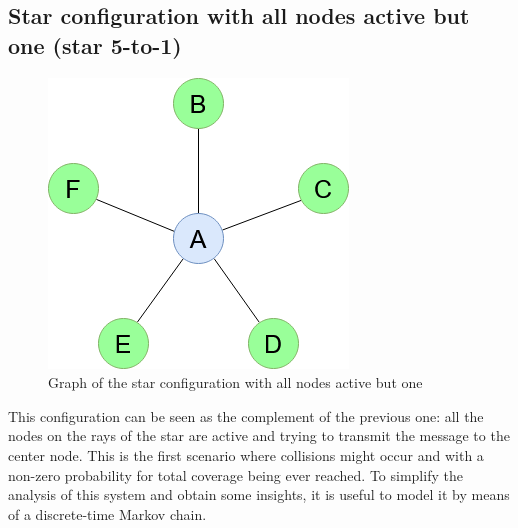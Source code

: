 \subsection{Star configuration with all nodes active but one (star 5-to-1)}
\label{ssec:star2}
\begin{figure}[H]
    \begin{center}
        \includegraphics[scale=0.4]{img/star_graph2.png}
        \caption{Graph of the star configuration with all nodes active but one}
        \label{fig:star5to1}
    \end{center}
\end{figure}
This configuration can be seen as the complement of the previous one: all the nodes
on the rays of the star are active and trying to transmit the message to the
center node. This is the first scenario where collisions might occur and with a
non-zero probability for total coverage being ever reached. To simplify the
analysis of this system and obtain some insights, it is useful to model it by
means of a discrete-time Markov chain.
